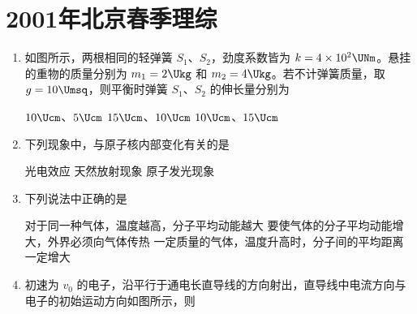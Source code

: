\documentclass[\gkver]{gaokaozhenti}
\begin{document}
\chapter{2001年北京春季理综}

\begin{enumerate}
\item
如图所示，两根相同的轻弹簧 $S_{1}$、$S_{2}$，劲度系数皆为 $k=4\times10^{2}\UNm$。悬挂的重物的质量分别为 $m_{1}=2\Ukg$ 和 $m_{2}=4\Ukg$。若不计弹簧质量，取 $g=10\Umsq$，则平衡时弹簧 $S_{1}$、$S_{2}$ 的伸长量分别为


{$10\Ucm$、$5\Ucm$}
{$15\Ucm$、$10\Ucm$}
{$10\Ucm$、$15\Ucm$}


\item
下列现象中，与原子核内部变化有关的是

{光电效应}
{天然放射现象}
{原子发光现象}


\item
下列说法中正确的是

{对于同一种气体，温度越高，分子平均动能越大}
{要使气体的分子平均动能增大，外界必须向气体传热}
{一定质量的气体，温度升高时，分子间的平均距离一定增大}


\item
初速为 $v_{0}$ 的电子，沿平行于通电长直导线的方向射出，直导线中电流方向与电子的初始运动方向如图所示，则


\end{enumerate}
\end{document}
